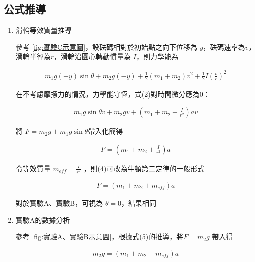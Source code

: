 \documentclass[11pt,a4paper]{article}
\theoremstyle{definition}
\begin{document}
        \subsection{公式推導}
            \begin{enumerate}

                \item 滑輪等效質量推導\par
                參考 \autoref{fig:實驗C示意圖}，設砝碼相對於初始點之向下位移為 $y$，砝碼速率為$v$，滑輪半徑為$r$，滑輪沿圓心轉動慣量為 $I$，則力學能為

                \begin{gather}
                    m_1 g (-y)\sin{\theta} + m_2 g (-y) + \frac{1}{2}(m_1 + m_2)v^2 + \frac{1}{2}I(\frac{v}{r})^2
                \end{gather}

                在不考慮摩擦力的情況，力學能守恆，式(2)對時間微分應為0：

                \begin{gather}
                    m_1 g \sin{\theta} v + m_2 g v + (m_1 + m_2 + \frac{I}{r^2})av
                \end{gather}                

                將 $F = m_2g + m_1g \sin{\theta}$帶入化簡得

                \begin{gather}
                    F = (m_1 + m_2 + \frac{I}{r^2})a
                \end{gather}

                令等效質量 $\displaystyle m_{eff} = \frac{I}{r^2}$ ，則(4)可改為牛頓第二定律的一般形式

                \begin{gather}
                    F = (m_1 + m_2 + m_{eff})a
                \end{gather}

                對於實驗A、實驗B，可視為 $\theta = 0$，結果相同

                \item 實驗A的數據分析\par
                參考 \autoref{fig:實驗A、實驗B示意圖}，根據式(5)的推導，將$F = m_2g$ 帶入得

                \begin{gather}
                    m_2g = (m_1 + m_2 + m_{eff})a
                \end{gather}


\end{enumerate}
\end{document}

